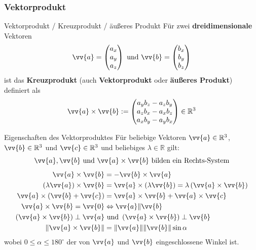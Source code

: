 \subsubsection{Vektorprodukt}
\begin{frame}{Vektorprodukt / Kreuzprodukt / äußeres Produkt}
	Für zwei \textbf{dreidimensionale} Vektoren
	\[
	\vv{a} = \begin{pmatrix}
	a_x \\ a_y \\ a_z
	\end{pmatrix} \mbox{ und } 	\vv{b} = \begin{pmatrix}
	b_x \\ b_y \\ b_z
	\end{pmatrix}
 	\]
 	ist das \textbf{Kreuzprodukt} (auch \textbf{Vektorprodukt} oder \textbf{äußeres Produkt}) definiert als
 	\[
	 	\vv{a} \times \vv{b} := \begin{pmatrix}
	 	a_y b_z - a_z b_y \\
	 	a_z b_x - a_x b_z \\
	 	a_x b_y - a_y b_x
	 	\end{pmatrix} \in \mathbb{R}^3
 	\]
\end{frame}

\begin{frame}{Eigenschaften des Vektorproduktes}
	Für beliebige Vektoren $\vv{a} \in \mathbb{R}^3$, $\vv{b} \in \mathbb{R}^3$ und $\vv{c} \in \mathbb{R}^3$ und beliebiges $\lambda \in \mathbb{R}$ gilt:
	\[	\vv{a}, \vv{b} \mbox{ und } \vv{a}  \times  		\vv{b}  \mbox{ bilden ein Rechts-System}
	\]
	\begin{align*}
		\vv{a} \times \vv{b} & =  - \vv{b} \times \vv{a} \\
		\left( \lambda \vv{a} \right) \times \vv{b} & =  \vv{a} \times \left( \lambda \vv{b} \right) = \lambda \left( \vv{a} \times \vv{b} \right)  \\
		\vv{a} \times \left( \vv{b} + \vv{c} \right) & =   \vv{a} \times \vv{b} + \vv{a} \times \vv{c} \\
		\vv{a} \times \vv{b} = \vv{0} &  \Leftrightarrow  \vv{a} \| \vv{b}  \\
		\left(\vv{a} \times \vv{b}\right) \perp \vv{a} & \mbox{ und }  \left(\vv{a} \times \vv{b}\right) \perp \vv{b} \\
		\left\| \vv{a} \times \vv{b} \right\| & =  \|\vv{a}\| \|\vv{b}\| \sin \alpha
	\end{align*}
	wobei $0 \leq \alpha \leq 180^\circ$ der von $\vv{a}$ und $\vv{b}$ eingeschlossene Winkel ist.
\end{frame}

